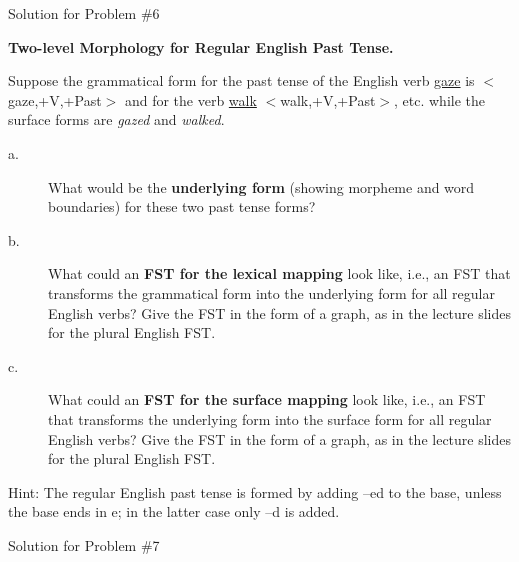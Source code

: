 \documentclass[11pt]{article}
\begin{document}
\begin{solution}
Solution for Problem \#6
\end{solution}

\vspace*{0.5cm}

\begin{problem}{7}
\textbf{Two-level Morphology for Regular English Past Tense.}

Suppose the grammatical form for the past tense of the English verb \underline{gaze} is $<$gaze,+V,+Past$>$ and for the verb \underline{walk} $<$walk,+V,+Past$>$, etc. while the surface forms are \textit{gazed} and \textit{walked}.

\begin{description}
	\item[a.] What would be the \textbf{underlying form} (showing morpheme and word boundaries) for these two past tense forms?
	
	\item[b.] What could an \textbf{FST for the lexical mapping} look like, i.e., an FST that transforms the grammatical form into the underlying form for all regular English verbs? Give the FST in the form of a graph, as in the lecture slides for the plural English FST.
	
	\item[c.] What could an \textbf{FST for the surface mapping} look like, i.e., an FST that transforms the underlying form into the surface form for all regular English verbs? Give the FST in the form of a graph, as in the lecture slides for the plural English FST.
\end{description}

Hint: The regular English past tense is formed by adding –ed to the base, unless the base ends in e; in the latter case only –d is added.

\end{problem}

\begin{solution}
Solution for Problem \#7
\end{solution}
\end{document}
